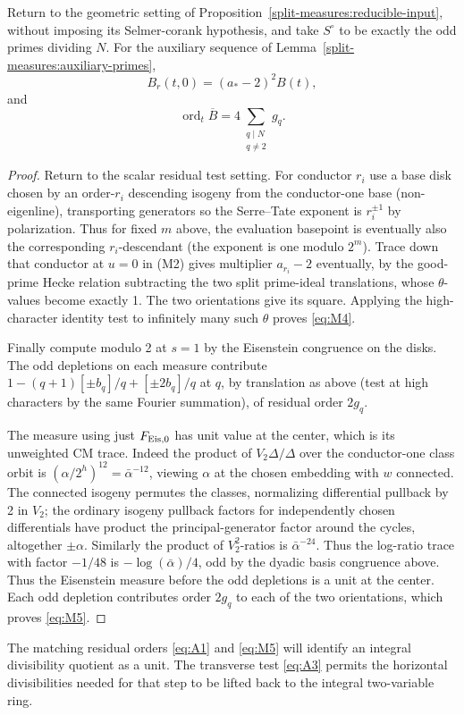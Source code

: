 \begin{lemma}
\label{split-measures:trace-residual}
Return to the geometric setting of
Proposition~\ref{split-measures:reducible-input}, without imposing its
Selmer-corank hypothesis, and take \(S^\circ\) to be exactly the odd primes dividing \(N\).  For the
auxiliary sequence of Lemma~\ref{split-measures:auxiliary-primes},
\[
 B_r(t,0)=(a_*-2)^2B(t),
 \tag{M4}\label{eq:M4}
\]
and
\[
 \operatorname{ord}_t\overline B
    =4\sum_{\substack{q\mid N\\q\ne2}}g_q.
 \tag{M5}\label{eq:M5}
\]
\end{lemma}
\begin{proof}
Return to the scalar residual test setting. For conductor \(r_i\) use a base disk chosen by an order-\(r_i\) descending isogeny from the conductor-one base (non-eigenline), transporting generators so the Serre--Tate exponent is \(r_i^{\pm1}\) by polarization. Thus for fixed \(m\) above, the evaluation basepoint is eventually also the corresponding \(r_i\)-descendant (the exponent is one modulo \(2^m\)). Trace down that conductor at \(u=0\) in (M2) gives multiplier \(a_{r_i}-2\) eventually, by the good-prime Hecke relation subtracting the two split prime-ideal translations, whose \(\theta\)-values become exactly 1. The two orientations give its square.  Applying the high-character
identity test to infinitely many such \(\theta\) proves \eqref{eq:M4}.

Finally compute modulo 2 at \(s=1\) by the Eisenstein congruence on the disks. The odd depletions on each measure contribute \(1-(q+1)[\pm b_q]/q+[\pm2b_q]/q\) at \(q\), by translation as above (test at high characters by the same Fourier summation), of residual order \(2g_q\). 

The measure using just \(F_{{\rm Eis},0}\) has unit value at the center, which is its unweighted CM trace. Indeed the product of \(V_2\Delta/\Delta\) over the conductor-one class orbit is \((\alpha/2^h)^{12}=\bar\alpha^{-12}\), viewing \(\alpha\) at the chosen embedding with \(w\) connected. The connected isogeny permutes the classes, normalizing differential pullback by 2 in \(V_2\); the ordinary isogeny pullback factors for independently chosen differentials have product the principal-generator factor around the cycles, altogether \(\pm\alpha\). Similarly the product of \(V_2^2\)-ratios is \(\bar\alpha^{-24}\). Thus the log-ratio trace with factor \(-1/48\) is \(-\log(\bar\alpha)/4\), odd by the dyadic basis congruence above. Thus the Eisenstein measure before the odd depletions is a unit at the center.  Each
odd depletion contributes order \(2g_q\) to each of the two orientations,
which proves \eqref{eq:M5}.
\end{proof}

The matching residual orders \eqref{eq:A1} and \eqref{eq:M5} will identify
an integral divisibility quotient as a unit.  The transverse test
\eqref{eq:A3} permits the horizontal divisibilities needed for that step
to be lifted back to the integral two-variable ring.
